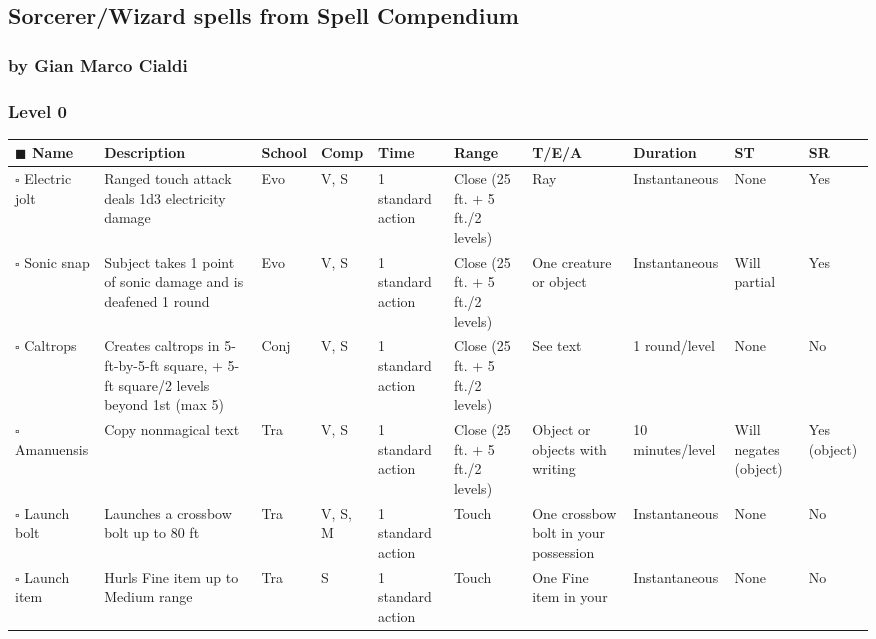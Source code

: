 \documentclass[12pt, a4paper]{article}
\begin{document}
\sffamily
{}
\renewcommand{\arraystretch}{1.5}
\tiny
\begin{center}
\section*{Sorcerer/Wizard spells from Spell Compendium}
  \subsubsection*{by Gian Marco Cialdi}
  \vspace{15pt}

  \subsubsection*{Level 0}
  \begin{longtable}[H]{ p{8em} p{15em} p{2em} p{5em} p{6em} p{6em} p{10em} p{6em} p{5em} p{2em} }
    \(\blacksquare\) \textbf{Name} & \textbf{Description} & \textbf{School} & \textbf{Comp} & \textbf{Time} & \textbf{Range} & \textbf{T/E/A} & \textbf{Duration} & \textbf{ST} & \textbf{SR}\\
    \endhead
    \(\square\) Electric jolt & Ranged touch attack deals 1d3 electricity damage & Evo & V, S & 1 standard action & Close (25 ft. + 5 ft./2 levels) & Ray & Instantaneous & None & Yes\\
    \(\square\) Sonic snap & Subject takes 1 point of sonic damage and is deafened 1 round & Evo & V, S & 1 standard action & Close (25 ft. + 5 ft./2 levels) & One creature or object & Instantaneous & Will partial & Yes\\
    \(\square\) Caltrops & Creates caltrops in 5-ft-by-5-ft square, + 5-ft square/2 levels beyond 1st (max 5) & Conj & V, S & 1 standard action & Close (25 ft. + 5 ft./2 levels) & See text & 1 round/level & None & No\\
    \(\square\) Amanuensis & Copy nonmagical text & Tra & V, S & 1 standard action & Close (25 ft. + 5 ft./2 levels) & Object or objects with writing & 10 minutes/level & Will negates (object) & Yes (object)\\
    \(\square\) Launch bolt & Launches a crossbow bolt up to 80 ft & Tra & V, S, M & 1 standard action & Touch & One crossbow bolt in your possession & Instantaneous & None & No\\
    \(\square\) Launch item & Hurls Fine item up to Medium range & Tra & S & 1 standard action & Touch & One Fine item in your  & Instantaneous & None & No\\

\end{longtable}
\end{center}
\end{document}
